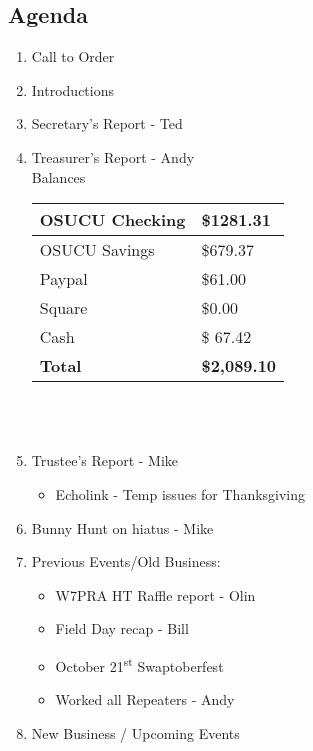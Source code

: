 \documentclass[letter,11pt]{extarticle}
\begin{document}
	\subsection*{Agenda}
	\begin{enumerate}
		\item Call to Order
		\item Introductions
		\item Secretary's Report - Ted
		\item Treasurer's Report - Andy \\
				Balances \\
			\begin{tabular}{|l|l|} \hline
				OSUCU Checking & \$1281.31 \\ \hline
				OSUCU Savings & \$679.37 \\ \hline
				Paypal & \$61.00 \\ \hline
				Square & \$0.00 \\ \hline
				Cash & \$ 67.42 \\ \hline
				\textbf{Total} & \textbf{\$2,089.10} \\ \hline
			\end{tabular} \\ \\
		\item Trustee's Report - Mike
			\begin{itemize}
				\item Echolink - Temp issues for Thanksgiving
			\end{itemize}
		\item Bunny Hunt on hiatus - Mike
		\item Previous Events/Old Business:
			\begin{itemize}
				\item W7PRA HT Raffle report - Olin
				\item Field Day recap - Bill
				\item October 21\textsuperscript{st} Swaptoberfest
				\item Worked all Repeaters - Andy
				\end{itemize}
		\item  New Business / Upcoming Events
			\begin{itemize}

\end{itemize}
\end{enumerate}
\end{document}
